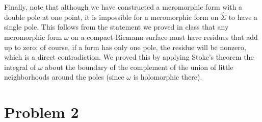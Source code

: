 \documentclass{../mathnotes}
\begin{document}
Finally, note that although we have constructed a meromorphic form with a double pole at one point, it is impossible for a meromorphic form on $\hat\Sigma$ to have a single pole.
This follows from the statement we proved in class that any meromorphic form $\omega$ on a compact Riemann surface must have residues that add up to zero; of course,
if a form has only one pole, the residue will be nonzero, which is a direct contradiction. We proved this by applying Stoke's theorem the integral of $\omega$
about the boundary of the complement of the union of little neighborhoods around the poles (since $\omega$ is holomorphic there).

\section*{Problem 2}
\end{document}
